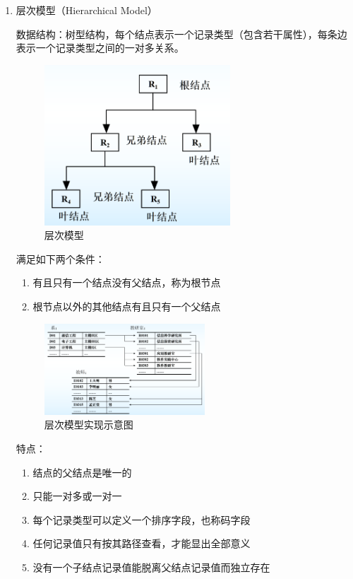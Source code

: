 \documentclass{article}
\begin{document}
\begin{enumerate}
    \item 层次模型（Hierarchical Model）

    数据结构：树型结构，每个结点表示一个记录类型（包含若干属性），每条边表示一个记录类型之间的一对多关系。

    \begin{figure}[H]
    
        \centering
        \includegraphics*[height = 6cm]{img/1.2-7.png}
        \caption{层次模型}
    \end{figure}

    满足如下两个条件：

    \begin{enumerate}
        \item 有且只有一个结点没有父结点，称为根节点
        \item 根节点以外的其他结点有且只有一个父结点
    \end{enumerate}

    \begin{figure}
        \centering
        \includegraphics[width = 6cm]{img/1.2-10.png}
        \caption{层次模型实现示意图}
    \end{figure}

    特点：

    \begin{enumerate}
        \item 结点的父结点是唯一的
        \item 只能一对多或一对一
        \item 每个记录类型可以定义一个排序字段，也称码字段
        \item 任何记录值只有按其路径查看，才能显出全部意义
        \item 没有一个子结点记录值能脱离父结点记录值而独立存在
    \end{enumerate}


\end{enumerate}
\end{document}
